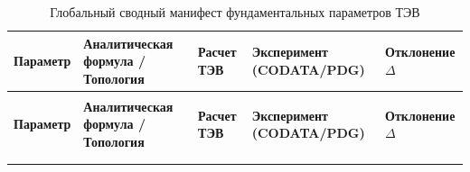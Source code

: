 \documentclass[11pt,a4paper]{article}
\theoremstyle{definition}
\theoremstyle{remark}
\begin{document}
\vspace{1mm}
\begingroup
\small
\setlength{\tabcolsep}{3.5pt}          %
\renewcommand{\arraystretch}{1.18}      %

\begin{xltabular}{\textwidth}{>{\raggedright\arraybackslash}p{3.2cm} X >{\centering\arraybackslash}p{2.7cm} >{\centering\arraybackslash}p{3.0cm} >{\raggedleft\arraybackslash}p{2.1cm}}

\caption{Глобальный сводный манифест фундаментальных параметров ТЭВ}
\label{tab:grand_master_manifest} \\
\toprule
\textbf{Параметр} & \textbf{Аналитическая формула / Топология} & \textbf{Расчет ТЭВ} & \textbf{Эксперимент (CODATA/PDG)} & \textbf{Отклонение $\Delta$} \\
\midrule
\endfirsthead

 \\[1.5mm]
\toprule
\textbf{Параметр} & \textbf{Аналитическая формула / Топология} & \textbf{Расчет ТЭВ} & \textbf{Эксперимент (CODATA/PDG)} & \textbf{Отклонение $\Delta$} \\
\midrule
\endhead

\midrule
{} \\
\endfoot

\bottomrule
\endlastfoot


\end{xltabular}
\end{document}
